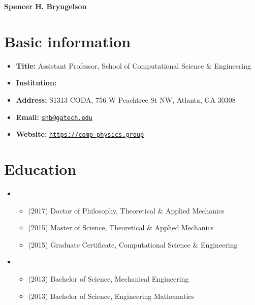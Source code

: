 


\usepackage[T1]{fontenc}
\usepackage{ebgaramond}




\begin{center}
    {\LARGE \bf Spencer H. Bryngelson} 
\end{center}



\section{Basic information}
\begin{itemize}
    \item[] \textbf{Title:} Assistant Professor, School of Computational Science \& Engineering
    \item[] \textbf{Institution:} \GIT
    \item[] \textbf{Address:} S1313 CODA, 756 W Peachtree St NW, Atlanta, GA 30308
    \item[] \textbf{Email:} \href{mailto:shb@gatech.edu}{\texttt{shb@gatech.edu}}
    \item[] \textbf{Website:} \href{https://comp-physics.group}{\texttt{https://comp-physics.group}}
\end{itemize}

\section{Education}

\begin{itemize}
    \item \UIUC
    \begin{itemize}
        \item[] (2017) Doctor of Philosophy, Theoretical \& Applied Mechanics
        \item[] (2015) Master of Science, Theoretical \& Applied Mechanics
        \item[] (2015) Graduate Certificate, Computational Science \& Engineering
    \end{itemize}
    \item \UMD
    \begin{itemize}
        \item[] (2013) Bachelor of Science, Mechanical Engineering
        \item[] (2013) Bachelor of Science, Engineering Mathematics
    \end{itemize}
\end{itemize}


